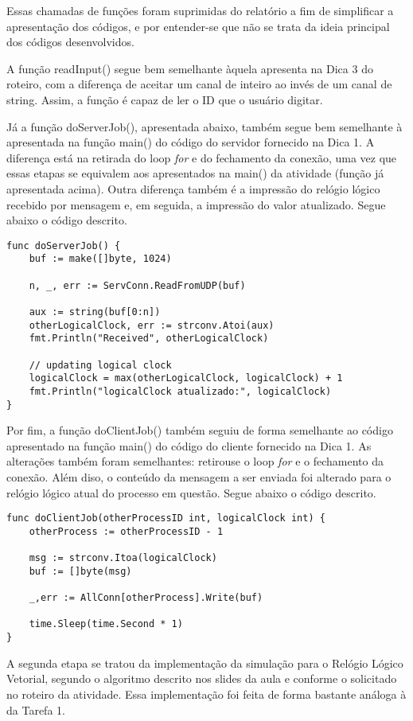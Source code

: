 \documentclass[conference]{IEEEtran}
\begin{document}
	Essas chamadas de funções foram suprimidas do relatório a fim de simplificar a apresentação dos códigos, e por entender-se que não se trata da ideia principal dos códigos desenvolvidos.
	
	A função readInput() segue bem semelhante àquela apresenta na Dica 3 do roteiro, com a diferença de aceitar um canal de inteiro ao invés de um canal de string. Assim, a função é capaz de ler o ID que o usuário digitar.
	
	Já a função doServerJob(), apresentada abaixo, também segue bem semelhante à apresentada na função main() do código do servidor fornecido na Dica 1. A diferença está na retirada do loop \textit{for} e do fechamento da conexão, uma vez que essas etapas se equivalem aos apresentados na main() da atividade (função já apresentada acima). Outra diferença também é a impressão do relógio lógico recebido por mensagem e, em seguida, a impressão do valor atualizado. Segue abaixo o código descrito.

\begin{lstlisting}
func doServerJob() {
	buf := make([]byte, 1024)

	n, _, err := ServConn.ReadFromUDP(buf)

	aux := string(buf[0:n])
	otherLogicalClock, err := strconv.Atoi(aux)
	fmt.Println("Received", otherLogicalClock)
	
	// updating logical clock
	logicalClock = max(otherLogicalClock, logicalClock) + 1
	fmt.Println("logicalClock atualizado:", logicalClock)
}
\end{lstlisting}

	Por fim, a função doClientJob() também seguiu de forma semelhante ao código apresentado na função main() do código do cliente fornecido na Dica 1. As alterações também foram semelhantes: retirouse o loop \textit{for} e o fechamento da conexão. Além diso, o conteúdo da mensagem a ser enviada foi alterado para o relógio lógico atual do processo em questão. Segue abaixo o código descrito.

\begin{lstlisting}
func doClientJob(otherProcessID int, logicalClock int) {
	otherProcess := otherProcessID - 1

	msg := strconv.Itoa(logicalClock)
	buf := []byte(msg)

	_,err := AllConn[otherProcess].Write(buf)

	time.Sleep(time.Second * 1)
}
\end{lstlisting}

	A segunda etapa se tratou da implementação da simulação para o Relógio Lógico Vetorial, segundo o algoritmo descrito nos slides da aula e conforme o solicitado no roteiro da atividade. Essa implementação foi feita de forma bastante análoga à da Tarefa 1.
	
\end{document}
